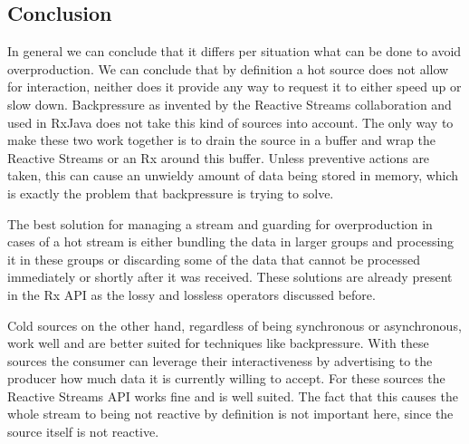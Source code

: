\subsection{Conclusion}
In general we can conclude that it differs per situation what can be done to avoid overproduction. We can conclude that by definition a hot source does not allow for interaction, neither does it provide any way to request it to either speed up or slow down. Backpressure as invented by the Reactive Streams collaboration and used in RxJava does not take this kind of sources into account. The only way to make these two work together is to drain the source in a buffer and wrap the Reactive Streams  or an Rx \obs around this buffer. Unless preventive actions are taken, this can cause an unwieldy amount of data being stored in memory, which is exactly the problem that backpressure is trying to solve.

The best solution for managing a stream and guarding for overproduction in cases of a hot stream is either bundling the data in larger groups and processing it in these groups or discarding some of the data that cannot be processed immediately or shortly after it was received. These solutions are already present in the Rx API as the lossy and lossless operators discussed before.

Cold sources on the other hand, regardless of being synchronous or asynchronous, work well and are better suited for techniques like backpressure. With these sources the consumer can leverage their interactiveness by advertising to the producer how much data it is currently willing to accept. For these sources the Reactive Streams API works fine and is well suited. The fact that this causes the whole stream to being not reactive by definition is not important here, since the source itself is not reactive.